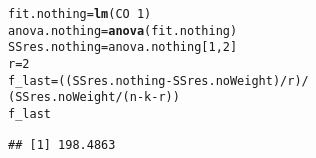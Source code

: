 \documentclass{article}\usepackage[]{graphicx}\usepackage[]{color}
\makeatletter
\newcommand{\hlnum}[1]{\textcolor[rgb]{0.686,0.059,0.569}{#1}}%
\newcommand{\hlopt}[1]{\textcolor[rgb]{0,0,0}{#1}}%
\newcommand{\hlstd}[1]{\textcolor[rgb]{0.345,0.345,0.345}{#1}}%
\newcommand{\hlkwb}[1]{\textcolor[rgb]{0.69,0.353,0.396}{#1}}%
\newcommand{\hlkwd}[1]{\textcolor[rgb]{0.737,0.353,0.396}{\textbf{#1}}}%
\newenvironment{kframe}{%
 \def\at@end@of@kframe{}%
 \ifinner\ifhmode%
  \def\at@end@of@kframe{\end{minipage}}%
  \begin{minipage}{\columnwidth}%
 \fi\fi%
 \def\FrameCommand##1{\hskip\@totalleftmargin \hskip-\fboxsep
 \colorbox{shadecolor}{##1}\hskip-\fboxsep
     \hskip-\linewidth \hskip-\@totalleftmargin \hskip\columnwidth}%
 \MakeFramed {\advance\hsize-\width
   \@totalleftmargin\z@ \linewidth\hsize
   \@setminipage}}%
 {\par\unskip\endMakeFramed%
 \at@end@of@kframe}
\newenvironment{knitrout}{}{} %
\makeatother
\begin{document}
\begin{knitrout}
\color{fgcolor}\begin{kframe}
\begin{alltt}
\hlstd{fit.nothing} \hlkwb{=} \hlkwd{lm}\hlstd{(CO} \hlopt{~} \hlnum{1}\hlstd{)}
\hlstd{anova.nothing} \hlkwb{=} \hlkwd{anova}\hlstd{(fit.nothing)}
\hlstd{SSres.nothing} \hlkwb{=} \hlstd{anova.nothing[}\hlnum{1}\hlstd{,}\hlnum{2}\hlstd{]}
\hlstd{r} \hlkwb{=} \hlnum{2}
\hlstd{f_last} \hlkwb{=} \hlstd{((SSres.nothing} \hlopt{-} \hlstd{SSres.noWeight)} \hlopt{/} \hlstd{r)} \hlopt{/}
          \hlstd{(SSres.noWeight}\hlopt{/}\hlstd{(n}\hlopt{-}\hlstd{k}\hlopt{-}\hlstd{r))}
\hlstd{f_last}
\end{alltt}
\begin{verbatim}
## [1] 198.4863
\end{verbatim}
\end{kframe}
\end{knitrout}
















  
 
\end{document}
